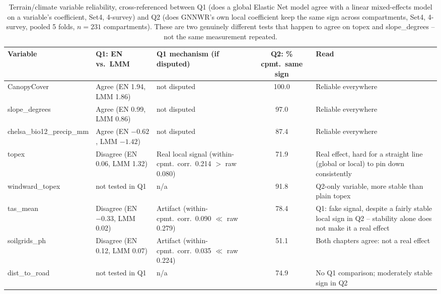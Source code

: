 \begin{table}[!htbp]
\centering
\scriptsize
\renewcommand{\arraystretch}{1.2}
\begin{tabular}{lp{3.3cm}p{4.2cm}cp{2.8cm}}
\toprule
Variable & Q1: EN vs.\ LMM & Q1 mechanism (if disputed) & Q2: \% cpmt.\ same sign & Read \\
\midrule
CanopyCover & Agree (EN 1.94, LMM 1.86) & not disputed & 100.0 & Reliable everywhere \\
slope\_degrees & Agree (EN 0.99, LMM 0.86) & not disputed & 97.0 & Reliable everywhere \\
chelsa\_bio12\_precip\_mm & Agree (EN $-0.62$, LMM $-1.42$) & not disputed & 87.4 & Reliable everywhere \\
topex & Disagree (EN 0.06, LMM 1.32) & Real local signal (within-cpmt.\ corr.\ 0.214 $>$ raw 0.080) & 71.9 & Real effect, hard for a straight line (global or local) to pin down consistently \\
windward\_topex & not tested in Q1 & n/a & 91.8 & Q2-only variable, more stable than plain topex \\
tas\_mean & Disagree (EN $-0.33$, LMM 0.02) & Artifact (within-cpmt.\ corr.\ 0.090 $\ll$ raw 0.279) & 78.4 & Q1: fake signal, despite a fairly stable local sign in Q2 -- stability alone does not make it a real effect \\
soilgrids\_ph & Disagree (EN 0.12, LMM 0.07) & Artifact (within-cpmt.\ corr.\ 0.035 $\ll$ raw 0.224) & 51.1 & Both chapters agree: not a real effect \\
dist\_to\_road & not tested in Q1 & n/a & 74.9 & No Q1 comparison; moderately stable sign in Q2 \\
\bottomrule
\end{tabular}
\caption{\small{Terrain/climate variable reliability, cross-referenced between Q1 (does a
global Elastic Net model agree with a linear mixed-effects model on a variable's
coefficient, Set4, 4-survey) and Q2 (does GNNWR's own local coefficient keep the same sign
across compartments, Set4, 4-survey, pooled 5 folds, $n=231$ compartments). These are two
genuinely different tests that happen to agree on topex and slope\_degrees -- not the same
measurement repeated.}}
\label{tab:results-q2-reliability}
\end{table}

